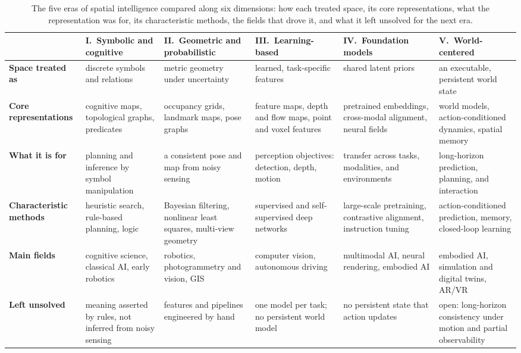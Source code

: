 \begin{table}[!t]
\centering
\fontsize{9}{11}\selectfont
\setlength{\tabcolsep}{1.0mm}
\caption{The five eras of spatial intelligence compared along six dimensions: how each treated space, its core representations, what the representation was for, its characteristic methods, the fields that drove it, and what it left unsolved for the next era.}
\label{tab:p1_s1_2_eras}
\begin{tabular}{L{0.145\textwidth} L{0.159\textwidth} L{0.159\textwidth} L{0.159\textwidth} L{0.159\textwidth} L{0.159\textwidth}}
\toprule
 & \textbf{I.\ Symbolic and cognitive}  & \textbf{II.\ Geometric and probabilistic}  & \textbf{III.\ Learning-based}  & \textbf{IV.\ Foundation models}  & \textbf{V.\ World-centered}  \\
\midrule
\textbf{Space treated as} & discrete symbols and relations & metric geometry under uncertainty & learned, task-specific features & shared latent priors & an executable, persistent world state \\
\textbf{Core representations} & cognitive maps, topological graphs, predicates & occupancy grids, landmark maps, pose graphs & feature maps, depth and flow maps, point and voxel features & pretrained embeddings, cross-modal alignment, neural fields & world models, action-conditioned dynamics, spatial memory \\
\textbf{What it is for} & planning and inference by symbol manipulation & a consistent pose and map from noisy sensing & perception objectives: detection, depth, motion & transfer across tasks, modalities, and environments & long-horizon prediction, planning, and interaction \\
\textbf{Characteristic methods} & heuristic search, rule-based planning, logic & Bayesian filtering, nonlinear least squares, multi-view geometry & supervised and self-supervised deep networks & large-scale pretraining, contrastive alignment, instruction tuning & action-conditioned prediction, memory, closed-loop learning \\
\textbf{Main fields} & cognitive science, classical AI, early robotics & robotics, photogrammetry and vision, GIS & computer vision, autonomous driving & multimodal AI, neural rendering, embodied AI & embodied AI, simulation and digital twins, AR/VR \\
\textbf{Left unsolved} & meaning asserted by rules, not inferred from noisy sensing & features and pipelines engineered by hand & one model per task; no persistent world model & no persistent state that action updates & open: long-horizon consistency under motion and partial observability \\
\bottomrule
\end{tabular}
\end{table}
